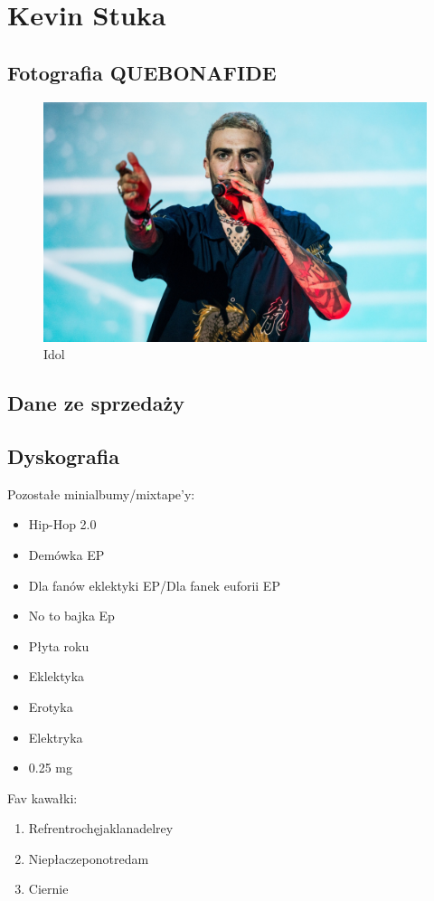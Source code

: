 \section{Kevin Stuka}
\label{sec:Kevin_Stuka}
\subsection{Fotografia QUEBONAFIDE}
\begin{figure}[h]
    \centering
    \includegraphics[scale = 0.35]{pictures/quebo.png}
    \caption{Idol}
    \label{fig:quebo}
\end{figure}
\subsection{Dane ze sprzedaży}

\subsection{Dyskografia}
Pozostałe minialbumy/mixtape'y:
\begin{itemize}
    \item Hip-Hop 2.0
    \item Demówka EP
    \item Dla fanów eklektyki EP/Dla fanek euforii EP
    \item No to bajka Ep
    \item Płyta roku
    \item Eklektyka
    \item Erotyka
    \item Elektryka
    \item 0.25 mg
\end{itemize}
Fav kawałki:
\begin{enumerate}
    \item Refrentrochęjaklanadelrey
    \item Niepłaczeponotredam
    \item Ciernie
\end{enumerate}
